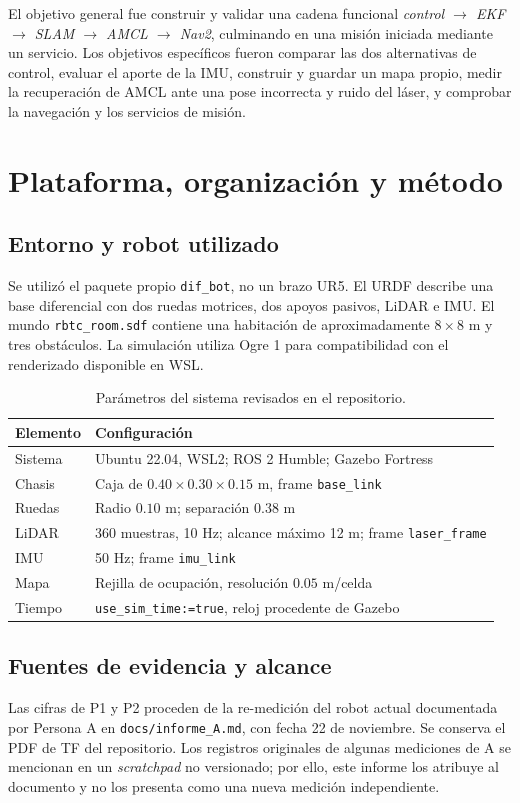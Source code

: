 \documentclass[11pt,a4paper]{article}
\newcommand{\archivo}[1]{\nolinkurl{#1}}
\begin{document}
El objetivo general fue construir y validar una cadena funcional \emph{control $\rightarrow$ EKF $\rightarrow$ SLAM $\rightarrow$ AMCL $\rightarrow$ Nav2}, culminando en una misión iniciada mediante un servicio. Los objetivos específicos fueron comparar las dos alternativas de control, evaluar el aporte de la IMU, construir y guardar un mapa propio, medir la recuperación de AMCL ante una pose incorrecta y ruido del láser, y comprobar la navegación y los servicios de misión.

\section{Plataforma, organización y método}
\subsection{Entorno y robot utilizado}
Se utilizó el paquete propio \archivo{dif_bot}, no un brazo UR5. El URDF describe una base diferencial con dos ruedas motrices, dos apoyos pasivos, LiDAR e IMU. El mundo \archivo{rbtc_room.sdf} contiene una habitación de aproximadamente $8\times8$ m y tres obstáculos. La simulación utiliza Ogre 1 para compatibilidad con el renderizado disponible en WSL.

\begin{table}[H]\centering\caption{Parámetros del sistema revisados en el repositorio.}
\begin{tabularx}{\linewidth}{lX}\toprule
Elemento & Configuración\\\midrule
Sistema & Ubuntu 22.04, WSL2; ROS 2 Humble; Gazebo Fortress\\
Chasis & Caja de $0.40\times0.30\times0.15$ m, frame \archivo{base_link}\\
Ruedas & Radio $0.10$ m; separación $0.38$ m\\
LiDAR & 360 muestras, 10 Hz; alcance máximo 12 m; frame \archivo{laser_frame}\\
IMU & 50 Hz; frame \archivo{imu_link}\\
Mapa & Rejilla de ocupación, resolución $0.05$ m/celda\\
Tiempo & \archivo{use_sim_time:=true}, reloj procedente de Gazebo\\\bottomrule
\end{tabularx}\end{table}

\subsection{Fuentes de evidencia y alcance}
Las cifras de P1 y P2 proceden de la re-medición del robot actual documentada por Persona A en \archivo{docs/informe_A.md}, con fecha 22 de noviembre. Se conserva el PDF de TF del repositorio. Los registros originales de algunas mediciones de A se mencionan en un \emph{scratchpad} no versionado; por ello, este informe los atribuye al documento y no los presenta como una nueva medición independiente.
\end{document}
